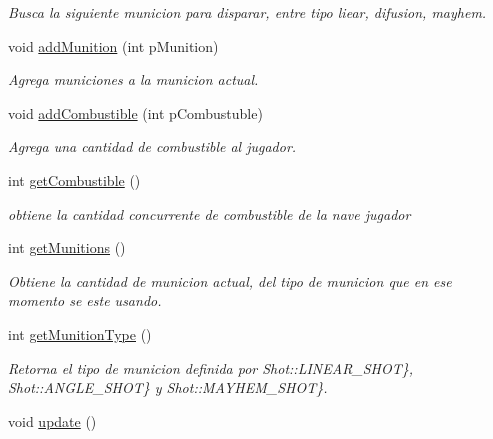 \begin{DoxyCompactItemize}
\begin{DoxyCompactList}\small\item\em Busca la siguiente municion para disparar, entre tipo liear, difusion, mayhem. \end{DoxyCompactList}\item 
void \hyperlink{class_player_rocket_a93f9d838d9b21c11ab9a2fe0176f9ff6}{add\-Munition} (int p\-Munition)
\begin{DoxyCompactList}\small\item\em Agrega municiones a la municion actual. \end{DoxyCompactList}\item 
void \hyperlink{class_player_rocket_ae7bf457ff4f9c794f9cf9f8cfadf4104}{add\-Combustible} (int p\-Combustuble)
\begin{DoxyCompactList}\small\item\em Agrega una cantidad de combustible al jugador. \end{DoxyCompactList}\item 
int \hyperlink{class_player_rocket_a0761ec562eed1e41ea87bff255b73090}{get\-Combustible} ()
\begin{DoxyCompactList}\small\item\em obtiene la cantidad concurrente de combustible de la nave jugador \end{DoxyCompactList}\item 
int \hyperlink{class_player_rocket_a1c7d7b49f3ba84be78aae03201ad338c}{get\-Munitions} ()
\begin{DoxyCompactList}\small\item\em Obtiene la cantidad de municion actual, del tipo de municion que en ese momento se este usando. \end{DoxyCompactList}\item 
int \hyperlink{class_player_rocket_ab9f347b5080e6db3e20f79030f50f3d8}{get\-Munition\-Type} ()
\begin{DoxyCompactList}\small\item\em Retorna el tipo de municion definida por Shot\-::\-L\-I\-N\-E\-A\-R\-\_\-\-S\-H\-O\-T\}, Shot\-::\-A\-N\-G\-L\-E\-\_\-\-S\-H\-O\-T\} y Shot\-::\-M\-A\-Y\-H\-E\-M\-\_\-\-S\-H\-O\-T\}. \end{DoxyCompactList}\item 
\hypertarget{class_player_rocket_a158f4ff0dd89fd4075688fa2b7d9e693}{void \hyperlink{class_player_rocket_a158f4ff0dd89fd4075688fa2b7d9e693}{update} ()}\label{class_player_rocket_a158f4ff0dd89fd4075688fa2b7d9e693}


\end{DoxyCompactItemize}
